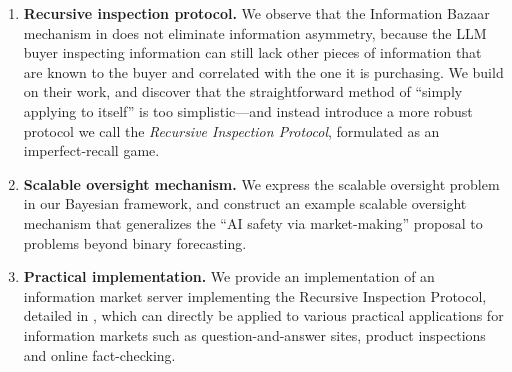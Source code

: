 \begin{enumerate}
  \item \textbf{Recursive inspection protocol.} We observe that the Information Bazaar mechanism in  does not eliminate information asymmetry, because the LLM buyer inspecting information can still lack other pieces of information that are known to the buyer and correlated with the one it is purchasing. We build on their work, and discover that the straightforward method of ``simply applying  to itself'' is too simplistic---and instead introduce a more robust protocol we call the \emph{Recursive Inspection Protocol}, formulated as an imperfect-recall game.
  \item \textbf{Scalable oversight mechanism.} We express the scalable oversight problem in our Bayesian framework, and construct an example scalable oversight mechanism that generalizes the ``AI safety via market-making'' proposal  to problems beyond binary forecasting.
  \item \textbf{Practical implementation.} We provide an implementation of an information market server implementing the Recursive Inspection Protocol, detailed in , which can directly be applied to various practical applications for information markets such as question-and-answer sites, product inspections and online fact-checking.
\end{enumerate}



